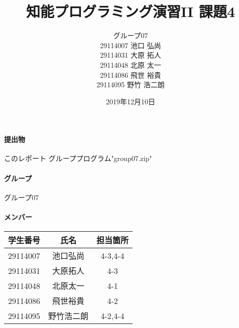 \documentclass{jarticle}
\title{知能プログラミング演習II 課題4}
\author{グループ07\\
    29114007 池口 弘尚\\
    29114031 大原 拓人\\
    29114048 北原 太一\\
    29114086 飛世 裕貴\\
    29114095 野竹 浩二朗\\
}
\date{2019年12月10日}
\begin{document}
\maketitle

\paragraph{提出物} このレポート グループプログラム"group07.zip"
\paragraph{グループ} グループ07
\paragraph{メンバー}
\begin{tabular}{|c|c|c|}
    \hline
    学生番号&氏名&担当箇所\\
    \hline\hline
    29114007&池口弘尚&4-3,4-4\\
    \hline
    29114031&大原拓人&4-3\\
    \hline
    29114048&北原太一&4-1\\
    \hline
    29114086&飛世裕貴&4-2\\
    \hline
    29114095&野竹浩二朗&4-2,4-4\\
    \hline
\end{tabular}
\end{document}
